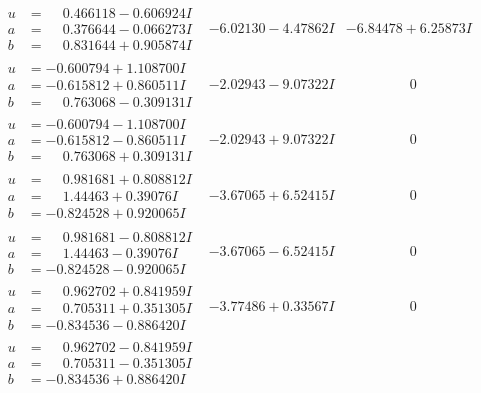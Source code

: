 \documentclass[1p]{elsarticle_modified}
\theoremstyle{definition}
\begin{document}
$$\begin{array}{c|c|c}
\begin{aligned}
u &= \phantom{-}0.466118 - 0.606924 I \\
a &= \phantom{-}0.376644 - 0.066273 I \\
b &= \phantom{-}0.831644 + 0.905874 I\end{aligned}
 & -6.02130 - 4.47862 I & -6.84478 + 6.25873 I \\ \hline\begin{aligned}
u &= -0.600794 + 1.108700 I \\
a &= -0.615812 + 0.860511 I \\
b &= \phantom{-}0.763068 - 0.309131 I\end{aligned}
 & -2.02943 - 9.07322 I & \phantom{-0.000000 } 0 \\ \hline\begin{aligned}
u &= -0.600794 - 1.108700 I \\
a &= -0.615812 - 0.860511 I \\
b &= \phantom{-}0.763068 + 0.309131 I\end{aligned}
 & -2.02943 + 9.07322 I & \phantom{-0.000000 } 0 \\ \hline\begin{aligned}
u &= \phantom{-}0.981681 + 0.808812 I \\
a &= \phantom{-}1.44463 + 0.39076 I \\
b &= -0.824528 + 0.920065 I\end{aligned}
 & -3.67065 + 6.52415 I & \phantom{-0.000000 } 0 \\ \hline\begin{aligned}
u &= \phantom{-}0.981681 - 0.808812 I \\
a &= \phantom{-}1.44463 - 0.39076 I \\
b &= -0.824528 - 0.920065 I\end{aligned}
 & -3.67065 - 6.52415 I & \phantom{-0.000000 } 0 \\ \hline\begin{aligned}
u &= \phantom{-}0.962702 + 0.841959 I \\
a &= \phantom{-}0.705311 + 0.351305 I \\
b &= -0.834536 - 0.886420 I\end{aligned}
 & -3.77486 + 0.33567 I & \phantom{-0.000000 } 0 \\ \hline\begin{aligned}
u &= \phantom{-}0.962702 - 0.841959 I \\
a &= \phantom{-}0.705311 - 0.351305 I \\
b &= -0.834536 + 0.886420 I\end{aligned}

\end{array}$$
\end{document}
